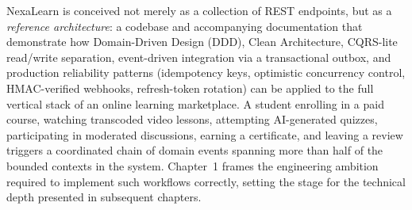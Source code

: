 NexaLearn is conceived not merely as a collection of REST endpoints, but as a \textit{reference architecture}: a codebase and accompanying documentation that demonstrate how Domain-Driven Design (DDD), Clean Architecture, CQRS-lite read/write separation, event-driven integration via a transactional outbox, and production reliability patterns (idempotency keys, optimistic concurrency control, HMAC-verified webhooks, refresh-token rotation) can be applied to the full vertical stack of an online learning marketplace. A student enrolling in a paid course, watching transcoded video lessons, attempting AI-generated quizzes, participating in moderated discussions, earning a certificate, and leaving a review triggers a coordinated chain of domain events spanning more than half of the bounded contexts in the system. Chapter~1 frames the engineering ambition required to implement such workflows correctly, setting the stage for the technical depth presented in subsequent chapters.






